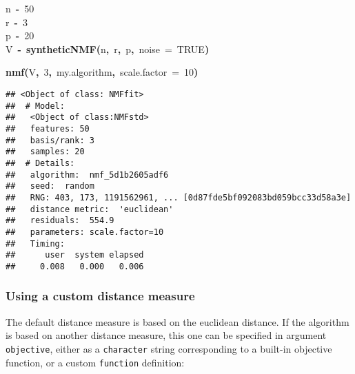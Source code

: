 \documentclass[a4paper]{article}\usepackage{graphicx, color}
\makeatletter
\newcommand{\hlnumber}[1]{\textcolor[rgb]{0,0,0}{#1}}%
\newcommand{\hlfunctioncall}[1]{\textcolor[rgb]{0.501960784313725,0,0.329411764705882}{\textbf{#1}}}%
\newcommand{\hlkeyword}[1]{\textcolor[rgb]{0,0,0}{\textbf{#1}}}%
\newcommand{\hlargument}[1]{\textcolor[rgb]{0.690196078431373,0.250980392156863,0.0196078431372549}{#1}}%
\newcommand{\hlassignement}[1]{\textcolor[rgb]{0,0,0}{\textbf{#1}}}%
\newcommand{\hlsymbol}[1]{\textcolor[rgb]{0,0,0}{#1}}%
\newcommand{\hlstd}[1]{\textcolor[rgb]{0,0,0}{#1}}%
\newenvironment{kframe}{%
 \def\FrameCommand##1{\hskip\@totalleftmargin \hskip-\fboxsep
 \colorbox{shadecolor}{##1}\hskip-\fboxsep
     \hskip-\linewidth \hskip-\@totalleftmargin \hskip\columnwidth}%
 \MakeFramed {\advance\hsize-\width
   \@totalleftmargin\z@ \linewidth\hsize
   \@setminipage}}%
 {\par\unskip\endMakeFramed}
\newenvironment{knitrout}{}{} %
\let\code=\texttt
\makeatother
\begin{document}
\begin{knitrout}
\color{fgcolor}\begin{kframe}
\begin{flushleft}
\ttfamily\noindent
\hlsymbol{n}{\ }\hlassignement{\usebox{\hlnormalsizeboxlessthan}-}{\ }\hlnumber{50}\hspace*{\fill}\\
\hlstd{}\hlsymbol{r}{\ }\hlassignement{\usebox{\hlnormalsizeboxlessthan}-}{\ }\hlnumber{3}\hspace*{\fill}\\
\hlstd{}\hlsymbol{p}{\ }\hlassignement{\usebox{\hlnormalsizeboxlessthan}-}{\ }\hlnumber{20}\hspace*{\fill}\\
\hlstd{}\hlsymbol{V}{\ }\hlassignement{\usebox{\hlnormalsizeboxlessthan}-}{\ }\hlfunctioncall{syntheticNMF}\hlkeyword{(}\hlsymbol{n}\hlkeyword{,}{\ }\hlsymbol{r}\hlkeyword{,}{\ }\hlsymbol{p}\hlkeyword{,}{\ }\hlargument{noise}{\ }\hlargument{=}{\ }\hlnumber{TRUE}\hlkeyword{)}\mbox{}
\normalfont
\end{flushleft}
\end{kframe}
\end{knitrout}


\begin{knitrout}
\color{fgcolor}\begin{kframe}
\begin{flushleft}
\ttfamily\noindent
\hlfunctioncall{nmf}\hlkeyword{(}\hlsymbol{V}\hlkeyword{,}{\ }\hlnumber{3}\hlkeyword{,}{\ }\hlsymbol{my.algorithm}\hlkeyword{,}{\ }\hlargument{scale.factor}{\ }\hlargument{=}{\ }\hlnumber{10}\hlkeyword{)}\mbox{}
\normalfont
\end{flushleft}
\begin{verbatim}
## <Object of class: NMFfit>
##  # Model:
##   <Object of class:NMFstd>
##   features: 50 
##   basis/rank: 3 
##   samples: 20 
##  # Details:
##   algorithm:  nmf_5d1b2605adf6 
##   seed:  random 
##   RNG: 403, 173, 1191562961, ... [0d87fde5bf092083bd059bcc33d58a3e]
##   distance metric:  'euclidean' 
##   residuals:  554.9 
##   parameters: scale.factor=10 
##   Timing:
##      user  system elapsed 
##     0.008   0.000   0.006 
\end{verbatim}
\end{kframe}
\end{knitrout}


\subsubsection{Using a custom distance measure}
The default distance measure is based on the euclidean distance. 
If the algorithm is based on another distance measure, this one can be specified in argument \code{objective}, either as a \code{character} string corresponding to a built-in objective function, or a custom \code{function} definition:
\end{document}
